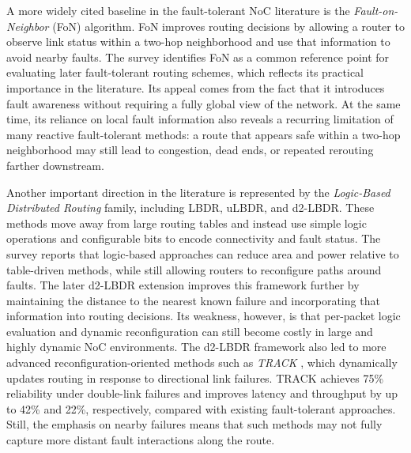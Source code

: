 A more widely cited baseline in the fault-tolerant NoC literature is the \textit{Fault-on-Neighbor} (FoN) \cite{Feng2010} algorithm. FoN improves routing decisions by allowing a router to observe link status within a two-hop neighborhood and use that information to avoid nearby faults. The survey identifies FoN as a common reference point for evaluating later fault-tolerant routing schemes, which reflects its practical importance in the literature. Its appeal comes from the fact that it introduces fault awareness without requiring a fully global view of the network. At the same time, its reliance on local fault information also reveals a recurring limitation of many reactive fault-tolerant methods: a route that appears safe within a two-hop neighborhood may still lead to congestion, dead ends, or repeated rerouting farther downstream.

Another important direction in the literature is represented by the \textit{Logic-Based Distributed Routing} \cite{Flich2008} family, including LBDR, uLBDR, and d2-LBDR. These methods move away from large routing tables and instead use simple logic operations and configurable bits to encode connectivity and fault status. The survey reports that logic-based approaches can reduce area and power relative to table-driven methods, while still allowing routers to reconfigure paths around faults. The later d2-LBDR extension improves this framework further by maintaining the distance to the nearest known failure and incorporating that information into routing decisions. Its weakness, however, is that per-packet logic evaluation and dynamic reconfiguration can still become costly in large and highly dynamic NoC environments. The d2-LBDR framework also led to more advanced reconfiguration-oriented methods such as \textit{TRACK} \cite{JAIN202092}, which dynamically updates routing in response to directional link failures. TRACK achieves 75\% reliability under double-link failures and improves latency and throughput by up to 42\% and 22\%, respectively, compared with existing fault-tolerant approaches. Still, the emphasis on nearby failures means that such methods may not fully capture more distant fault interactions along the route.

